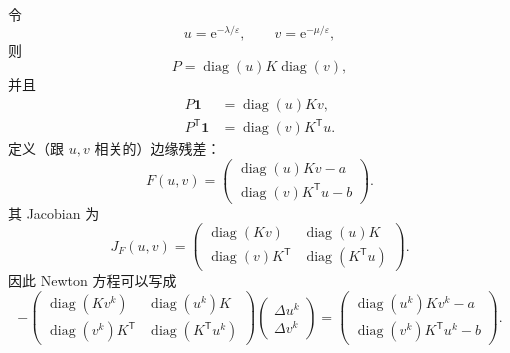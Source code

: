 \documentclass[11pt,a4paper]{ctexart}
\newcommand{\diag}{\operatorname{diag}}
\newcommand{\e}{\mathrm{e}}
\newcommand{\vone}{\bm{1}}
\newcommand{\trans}{\mathsf{T}}
\begin{document}
令
\begin{equation}
  u=\e^{-\lambda/\varepsilon},
  \qquad
  v=\e^{-\mu/\varepsilon},
\end{equation}
则
\begin{equation}
  P=\diag(u)K\diag(v),
\end{equation}
并且
\begin{equation}
\begin{aligned}
  P\vone &=\diag(u)Kv,\\
  P^{\trans}\vone &=\diag(v)K^{\trans}u.
\end{aligned}
\end{equation}
定义（跟 $u,v$ 相关的）边缘残差：
\begin{equation}
  F(u,v)=
  \begin{pmatrix}
    \diag(u)Kv-a\\[0.2em]
    \diag(v)K^{\trans}u-b
  \end{pmatrix}.
\end{equation}
其 Jacobian 为
\begin{equation}
  J_F(u,v)=
  \begin{pmatrix}
    \diag(Kv) & \diag(u)K\\
    \diag(v)K^{\trans} & \diag(K^{\trans}u)
  \end{pmatrix}.
\end{equation}
因此 Newton 方程可以写成
\begin{equation}\label{eq:newton-uv}
  -
  \begin{pmatrix}
    \diag(Kv^k) & \diag(u^k)K\\
    \diag(v^k)K^{\trans} & \diag(K^{\trans}u^k)
  \end{pmatrix}
  \begin{pmatrix}
    \Delta u^k\\[0.2em]
    \Delta v^k
  \end{pmatrix}
  =
  \begin{pmatrix}
    \diag(u^k)Kv^k-a\\[0.2em]
    \diag(v^k)K^{\trans}u^k-b
  \end{pmatrix}.
\end{equation}
\end{document}
